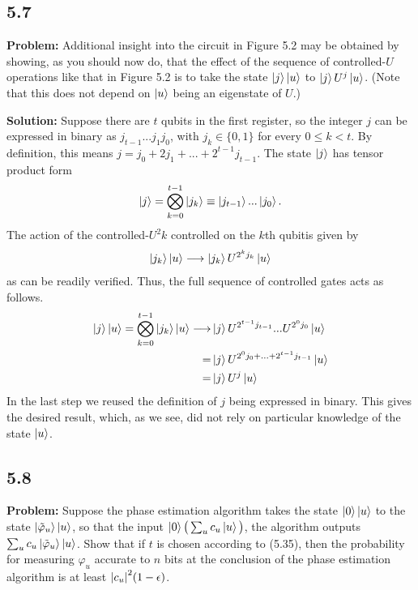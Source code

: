 \documentclass{article}
\begin{document}
\subsection*{5.7}
\textbf{Problem:} Additional insight into the circuit in Figure 5.2 may be obtained by showing, as you should now do, that the effect of the sequence of controlled-$U$ operations like that in Figure 5.2 is to take the state $\ket{j}\ket{u}$ to $\ket{j}U^j\ket{u}$. (Note that this does not depend on $\ket{u}$ being an eigenstate of $U$.)

\textbf{Solution:} Suppose there are $t$ qubits in the first register, so the integer $j$ can be expressed in binary as $j_{t-1}...j_1j_0$, with $j_k \in \{0,1\}$ for every $0\leq k < t$. By definition, this means $j = j_0 + 2j_1 + ... + 2^{t-1}j_{t-1}$. The state $\ket{j}$ has tensor product form
\begin{align}
    \ket{j} = \bigotimes_{k=0}^{t-1} \ket{j_k} \equiv \ket{j_{t-1}}...\ket{j_{0}}.
\end{align}
The action of the controlled-$U^2k$ controlled on the $k$th qubitis given by
\begin{align}
    \ket{j_k}\ket{u} \longrightarrow  \ket{j_k} U^{2^k j_k}\ket{u}
\end{align}
as can be readily verified. Thus, the full sequence of controlled gates acts as follows.
\begin{align}
\begin{aligned}
    \ket{j}\ket{u} = \bigotimes_{k=0}^{t-1} \ket{j_k}\ket{u} \longrightarrow &\ket{j}U^{2^{t-1}j_{t-1}}...U^{2^0 j_0}\ket{u} \\
    = &\ket{j}U^{2^0 j_0 + ... + 2^{t-1} j_{t-1}}\ket{u} \\
    = &\ket{j}U^j\ket{u}
\end{aligned}
\end{align}
In the last step we reused the definition of $j$ being expressed in binary. This gives the desired result, which, as we see, did not rely on particular knowledge of the state $\ket{u}$.

\subsection*{5.8}
\textbf{Problem:} Suppose the phase estimation algorithm takes the state $\ket{0}\ket{u}$ to the state $\ket{\tilde{\varphi}_u}\ket{u}$, so that the input $\ket{0}\big(\sum_u c_u\ket{u}\big)$, the algorithm outputs $\sum_u c_u\ket{\tilde{\varphi}_u}\ket{u}$. Show that if $t$ is chosen according to (5.35), then the probability for measuring $\varphi_u$ accurate to $n$ bits at the conclusion of the phase estimation algorithm is at least $\abs{c_u}^2(1-\epsilon)$.
\end{document}

